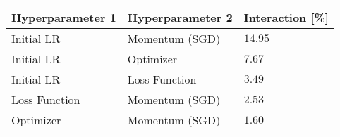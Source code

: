 \begin{tabular}{lll}
\toprule
Hyperparameter 1 & Hyperparameter 2 & Interaction [\%] \\
\midrule
Initial LR & Momentum (SGD) & $14.95$ \\
Initial LR & Optimizer & $7.67$ \\
Initial LR & Loss Function & $3.49$ \\
Loss Function & Momentum (SGD) & $2.53$ \\
Optimizer & Momentum (SGD) & $1.60$ \\
\bottomrule
\end{tabular}
